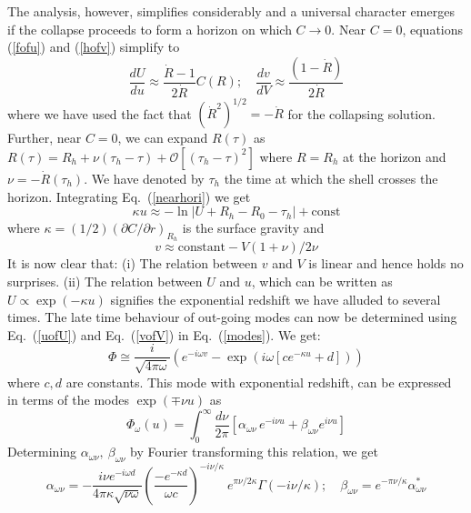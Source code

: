 \documentclass[12pt]{iopart}
\begin{document}
  The analysis, however, simplifies considerably and a universal
  character emerges if the collapse proceeds to form a horizon on which $C\to 0$. Near $C=0$, equations
  (\ref{fofu}) and (\ref{hofv}) simplify to 
  \begin{equation}
  \frac{dU}{du} \approx\frac{\dot R -1}{2\dot R} C(R); \quad \frac{dv}{dV} \approx\frac{(1-\dot R )}{2\dot R} 
  \label{nearhori}
  \end{equation}
  where we have used the fact that $(\dot R^2)^{1/2}=-\dot R$ for the collapsing
  solution. Further, near $C=0$, we can expand $R(\tau)$ as 
  $R(\tau) = R_h +\nu(\tau_h - \tau) + \mathcal{O} [(\tau_h - \tau)^2]$
  where $R=R_h$ at the horizon and $\nu=-\dot R(\tau_h)$. 
  We have denoted by $\tau_h$ the time at which the shell crosses the horizon.
  Integrating Eq.~(\ref{nearhori})  we get
  \begin{equation}
   \kappa  u \approx - \ln |U+R_h - R_0 -\tau_h| + \textrm{const}
  \label{uofU}
  \end{equation}
  where $\kappa =(1/2)(\partial C/\partial r)_{R_h}$ is the surface gravity
  and
  \begin{equation}
  v \approx \textrm{constant} -  V(1+ \nu) / 2\nu 
  \label{vofV}
  \end{equation}
  It is now clear that: (i) The relation between $v$ and $V$ is linear and hence holds no surprises. (ii) The relation between $U$ and $u$, which can be written as $U\propto \exp(- \kappa   u)$   signifies the exponential  redshift we have alluded to several times. The late time
  behaviour of out-going modes can now be determined using Eq.~(\ref{uofU}) and Eq.~(\ref{vofV}) in Eq.~(\ref{modes}).
  We get:
  \begin{equation}
  \Phi \cong  \frac{i}{\sqrt{4\pi \omega}} \left( e^{-i\omega v} 
  - \exp\left(i\omega\left[ ce^{- \kappa  u} + d\right]\right)\right)
  \label{latephi}
  \end{equation}
  where $c,d$ are constants. This mode with exponential redshift, can be expressed in terms of the modes $\exp(\mp \nu u)$ as
  \begin{equation}
\Phi_\omega(u) = \int_0^\infty \frac{d\nu}{2\pi} \left[ \alpha_{\omega\nu} \, e^{-i\nu u}+ \beta_{\omega\nu} e^{i\nu u}\right]
\end{equation}
Determining $\alpha_{\omega\nu},\ \beta _{\omega\nu}$ by Fourier transforming this relation, we get
\begin{equation}
  \alpha_{\omega\nu} =- \frac{i \nu e^{-i\omega d } }{4\pi\kappa \sqrt{\nu \omega}} 
  \left( \frac{-e^{-\kappa d}}{\omega c} \right)^{- i \nu/\kappa} 
   \  e^{\pi \nu/2\kappa} \Gamma (- i \nu/\kappa); \quad 
   \beta _{\omega\nu} = e^{- \pi \nu/\kappa } \alpha^*_{\omega \nu}
  \end{equation}  
\end{document}
